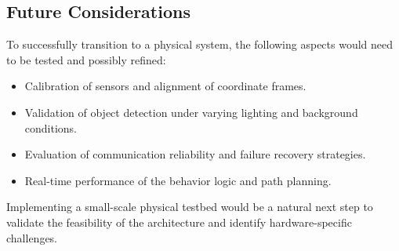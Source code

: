 \subsection{Future Considerations}
To successfully transition to a physical system, the following aspects would need to be tested and possibly refined:
\begin{itemize}
  \item Calibration of sensors and alignment of coordinate frames.
  \item Validation of object detection under varying lighting and background conditions.
  \item Evaluation of communication reliability and failure recovery strategies.
  \item Real-time performance of the behavior logic and path planning.
\end{itemize}

Implementing a small-scale physical testbed would be a natural next step to validate the feasibility of the architecture and identify hardware-specific challenges.
